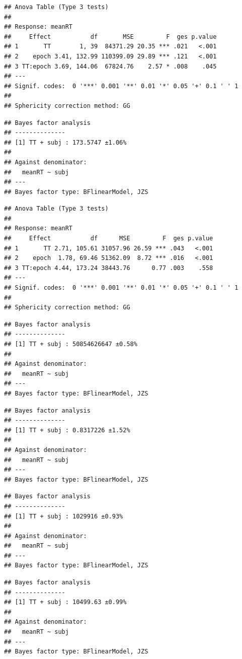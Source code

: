 \documentclass[
  man]{apa7}
\begin{document}
\begin{verbatim}
## Anova Table (Type 3 tests)
## 
## Response: meanRT
##     Effect           df       MSE         F  ges p.value
## 1       TT        1, 39  84371.29 20.35 *** .021   <.001
## 2    epoch 3.41, 132.99 110399.09 29.89 *** .121   <.001
## 3 TT:epoch 3.69, 144.06  67824.76    2.57 * .008    .045
## ---
## Signif. codes:  0 '***' 0.001 '**' 0.01 '*' 0.05 '+' 0.1 ' ' 1
## 
## Sphericity correction method: GG
\end{verbatim}

\begin{verbatim}
## Bayes factor analysis
## --------------
## [1] TT + subj : 173.5747 ±1.06%
## 
## Against denominator:
##   meanRT ~ subj 
## ---
## Bayes factor type: BFlinearModel, JZS
\end{verbatim}

\begin{verbatim}
## Anova Table (Type 3 tests)
## 
## Response: meanRT
##     Effect           df      MSE         F  ges p.value
## 1       TT 2.71, 105.61 31057.96 26.59 *** .043   <.001
## 2    epoch  1.78, 69.46 51362.09  8.72 *** .016   <.001
## 3 TT:epoch 4.44, 173.24 38443.76      0.77 .003    .558
## ---
## Signif. codes:  0 '***' 0.001 '**' 0.01 '*' 0.05 '+' 0.1 ' ' 1
## 
## Sphericity correction method: GG
\end{verbatim}

\begin{verbatim}
## Bayes factor analysis
## --------------
## [1] TT + subj : 50854626647 ±0.58%
## 
## Against denominator:
##   meanRT ~ subj 
## ---
## Bayes factor type: BFlinearModel, JZS
\end{verbatim}

\begin{verbatim}
## Bayes factor analysis
## --------------
## [1] TT + subj : 0.8317226 ±1.52%
## 
## Against denominator:
##   meanRT ~ subj 
## ---
## Bayes factor type: BFlinearModel, JZS
\end{verbatim}

\begin{verbatim}
## Bayes factor analysis
## --------------
## [1] TT + subj : 1029916 ±0.93%
## 
## Against denominator:
##   meanRT ~ subj 
## ---
## Bayes factor type: BFlinearModel, JZS
\end{verbatim}

\begin{verbatim}
## Bayes factor analysis
## --------------
## [1] TT + subj : 10499.63 ±0.99%
## 
## Against denominator:
##   meanRT ~ subj 
## ---
## Bayes factor type: BFlinearModel, JZS
\end{verbatim}
\end{document}
